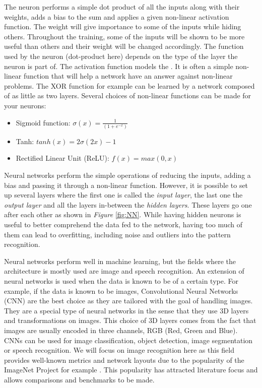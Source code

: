 The neuron performs a simple dot product of all the inputs along with their weights, adds a bias to the sum and applies a given non-linear activation function. The weight will give importance to some of the inputs while hiding others. Throughout the training, some of the inputs will be shown to be more useful than others and their weight will be changed accordingly. The function used by the neuron (dot-product here) depends on the type of the layer the neuron is part of. The activation function models the . It is often a simple non-linear function that will help a network have an answer against non-linear problems. The XOR function for example can be learned by a network composed of as little as two layers. Several choices of non-linear functions can be made for your neurons:
\begin{itemize}
  \item Sigmoid function: $\sigma(x) = \frac{1}{(1+e^{-x})}$
  \item Tanh: $tanh(x) = 2\sigma(2x) - 1$
  \item Rectified Linear Unit (ReLU): $ f(x) = max(0,x) $
\end{itemize}

Neural networks perform the simple operations of reducing the inputs, adding a bias and passing it through a non-linear function. However, it is possible to set up several layers where the first one is called the \emph{input layer}, the last one the \emph{output layer} and all the layers in-between the \emph{hidden layers}. These layers go one after each other as shown in \emph{Figure} \ref{fig:NN}. While having hidden neurons is useful to better comprehend the data fed to the network, having too much of them can lead to overfitting, including noise and outliers into the pattern recognition.

Neural networks perform well in machine learning, but the fields where the architecture is mostly used are image and speech recognition. An extension of neural networks is used when the data is known to be of a certain type. For example, if the data is known to be images, Convolutional Neural Networks (CNN) are the best choice as they are tailored with the goal of handling images. They are a special type of neural networks in the sense that they use 3D layers and transformations on images. This choice of 3D layers comes from the fact that images are usually encoded in three channels, RGB (Red, Green and Blue). CNNs can be used for image classification, object detection, image segmentation or speech recognition. We will focus on image recognition here as this field provides well-known metrics and network layouts due to the popularity of the ImageNet Project for example \cite{ImageNet2009}. This popularity has attracted literature focus and allows comparisons and benchmarks to be made.

